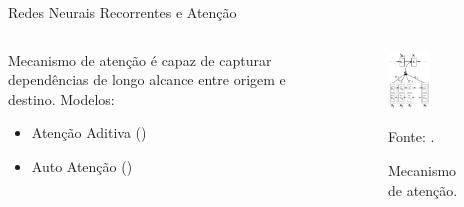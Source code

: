     \begin{frame}{Redes Neurais Recorrentes e Atenção}

        \Large
        \begin{columns}
            \begin{column}{0.5\textwidth}

                Mecanismo de atenção é capaz de capturar dependências de longo alcance entre origem e destino. Modelos:

                \begin{itemize}
                    \item Atenção Aditiva (\citeauthor{bahdanau2015neural})
                    \item Auto Atenção (\citeauthor{vaswani2017attention})
                \end{itemize}
                

            \end{column}

            \begin{column}{0.5\textwidth}

                \begin{figure}[htbp]
                    \centering
                    \caption{Mecanismo de atenção.}
                    \label{fig:attention}
                    \includegraphics[width=0.5\textwidth]{images/attention.png}
                    \par \footnotesize Fonte: \citeauthor{bahdanau2015neural}.
                \end{figure}
        
        
            \end{column}
        \end{columns}


    \end{frame}
